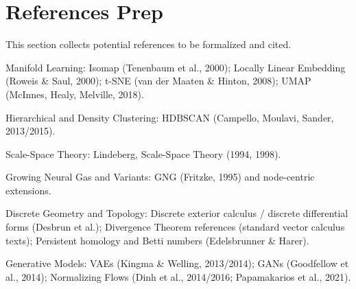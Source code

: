 \documentclass[11pt]{article}
\begin{document}
\section{References Prep}

This section collects potential references to be formalized and cited.

{\setlength{\parindent}{0pt}%
\setlength{\parskip}{0.6em}%

Manifold Learning: Isomap (Tenenbaum et al., 2000); Locally Linear Embedding (Roweis \& Saul, 2000); t-SNE (van der Maaten \& Hinton, 2008); UMAP (McInnes, Healy, Melville, 2018).

Hierarchical and Density Clustering: HDBSCAN (Campello, Moulavi, Sander, 2013/2015).

Scale-Space Theory: Lindeberg, Scale-Space Theory (1994, 1998).

Growing Neural Gas and Variants: GNG (Fritzke, 1995) and node-centric extensions.

Discrete Geometry and Topology: Discrete exterior calculus / discrete differential forms (Desbrun et al.); Divergence Theorem references (standard vector calculus texts); Persistent homology and Betti numbers (Edelsbrunner \& Harer).

Generative Models: VAEs (Kingma \& Welling, 2013/2014); GANs (Goodfellow et al., 2014); Normalizing Flows (Dinh et al., 2014/2016; Papamakarios et al., 2021).

}
\end{document}
